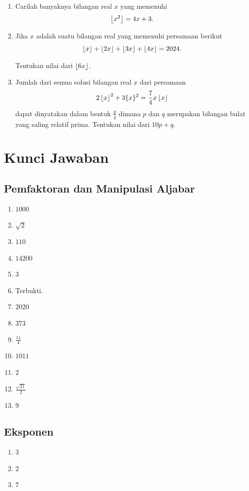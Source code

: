 \documentclass[12pt]{scrartcl}
\begin{document}
\begin{enumerate}
    \item Carilah banyaknya bilangan real $x$ yang memenuhi
    $$\left\lfloor x^2 \right\rfloor=4x+3.$$

    \item Jika $x$ adalah suatu bilangan real yang memenuhi persamaan berikut
    $$\left\lfloor x \right\rfloor+\left\lfloor 2x \right\rfloor+\left\lfloor 3x \right\rfloor+\left\lfloor 4x \right\rfloor=2024.$$

    Tentukan nilai dari $\left\lfloor 6x \right\rfloor$.

    \item Jumlah dari semua solusi bilangan real $x$ dari persamaan
    $$2\left\lfloor x \right\rfloor^2+3\{x\}^2=\frac{7}{4}x\left\lfloor x \right\rfloor$$
    dapat dinyatakan dalam bentuk $\frac{p}{q}$ dimana $p$ dan $q$ merupakan bilangan bulat yang saling relatif prima. Tentukan nilai dari $10p+q$.
\end{enumerate}


\section{Kunci Jawaban}
\subsection{Pemfaktoran dan Manipulasi Aljabar}
\begin{enumerate}
\item $1000$
\item $\sqrt{2}$
\item $110$
\item $14200$
\item $3$
\item Terbukti.
\item $2020$
\item $373$
\item $\frac{11}{4}$
\item $1011$
\item $2$
\item $\frac{\sqrt{21}}{2}$
\item $9$
\end{enumerate}
\subsection{Eksponen}
\begin{enumerate}
\item $3$
\item $2$
\item $7$
\end{enumerate}
\end{document}
